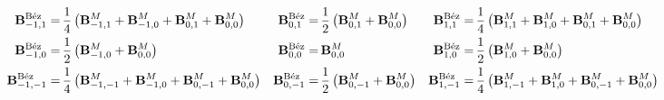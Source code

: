 \begin{scriptsize}
\begin{align*}
\petersLocalBezPointIndices{-1,1} =&\, \frac{1}{4}\left(\petersLocalPatchPointIndices{-1,1} + \petersLocalPatchPointIndices{-1,0} + \petersLocalPatchPointIndices{0,1} + \petersLocalPatchPointIndices{0,0}\right)
&
\petersLocalBezPointIndices{0,1} =&\, \frac{1}{2}\left(\petersLocalPatchPointIndices{0,1} + \petersLocalPatchPointIndices{0,0}\right)
&
\petersLocalBezPointIndices{1,1} =&\, \frac{1}{4}\left(\petersLocalPatchPointIndices{1,1} + \petersLocalPatchPointIndices{1,0} + \petersLocalPatchPointIndices{0,1} + \petersLocalPatchPointIndices{0,0}\right)
\\
\petersLocalBezPointIndices{-1,0} =&\, \frac{1}{2}\left(\petersLocalPatchPointIndices{-1,0} +  \petersLocalPatchPointIndices{0,0}\right) 
&
\petersLocalBezPointIndices{0,0} =&\, \petersLocalPatchPointIndices{0,0}
&
\petersLocalBezPointIndices{1,0} =&\, \frac{1}{2}\left(\petersLocalPatchPointIndices{1,0} + \petersLocalPatchPointIndices{0,0}\right)
\\
\petersLocalBezPointIndices{-1,-1} =&\, \frac{1}{4}\left(\petersLocalPatchPointIndices{-1,-1} + \petersLocalPatchPointIndices{-1,0} + \petersLocalPatchPointIndices{0,-1} + \petersLocalPatchPointIndices{0,0}\right) 
&
\petersLocalBezPointIndices{0,-1} =&\, \frac{1}{2}\left(\petersLocalPatchPointIndices{0,-1} + \petersLocalPatchPointIndices{0,0}\right)
&
\petersLocalBezPointIndices{1,-1} =&\, \frac{1}{4}\left(\petersLocalPatchPointIndices{1,-1} + \petersLocalPatchPointIndices{1,0} + \petersLocalPatchPointIndices{0,-1} + \petersLocalPatchPointIndices{0,0}\right)
\end{align*}
\end{scriptsize}

